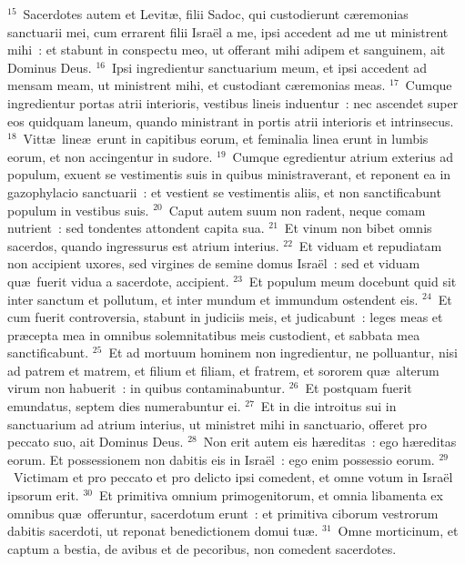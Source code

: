 ${}^{15}$~Sacerdotes autem et Levit\ae , filii Sadoc, qui custodierunt c\ae remonias sanctuarii mei, cum errarent filii Isra\"el a me, ipsi accedent ad me ut ministrent mihi~: et stabunt in conspectu meo, ut offerant mihi adipem et sanguinem, ait Dominus Deus.
${}^{16}$~Ipsi ingredientur sanctuarium meum, et ipsi accedent ad mensam meam, ut ministrent mihi, et custodiant c\ae remonias meas.
${}^{17}$~Cumque ingredientur portas atrii interioris, vestibus lineis induentur~: nec ascendet super eos quidquam laneum, quando ministrant in portis atrii interioris et intrinsecus.
${}^{18}$~Vitt\ae\ line\ae\ erunt in capitibus eorum, et feminalia linea erunt in lumbis eorum, et non accingentur in sudore.
${}^{19}$~Cumque egredientur atrium exterius ad populum, exuent se vestimentis suis in quibus ministraverant, et reponent ea in gazophylacio sanctuarii~: et vestient se vestimentis aliis, et non sanctificabunt populum in vestibus suis.
${}^{20}$~Caput autem suum non radent, neque comam nutrient~: sed tondentes attondent capita sua.
${}^{21}$~Et vinum non bibet omnis sacerdos, quando ingressurus est atrium interius.
${}^{22}$~Et viduam et repudiatam non accipient uxores, sed virgines de semine domus Isra\"el~: sed et viduam qu\ae\ fuerit vidua a sacerdote, accipient.
${}^{23}$~Et populum meum docebunt quid sit inter sanctum et pollutum, et inter mundum et immundum ostendent eis.
${}^{24}$~Et cum fuerit controversia, stabunt in judiciis meis, et judicabunt~: leges meas et pr\ae cepta mea in omnibus solemnitatibus meis custodient, et sabbata mea sanctificabunt.
${}^{25}$~Et ad mortuum hominem non ingredientur, ne polluantur, nisi ad patrem et matrem, et filium et filiam, et fratrem, et sororem qu\ae\ alterum virum non habuerit~: in quibus contaminabuntur.
${}^{26}$~Et postquam fuerit emundatus, septem dies numerabuntur ei.
${}^{27}$~Et in die introitus sui in sanctuarium ad atrium interius, ut ministret mihi in sanctuario, offeret pro peccato suo, ait Dominus Deus.
${}^{28}$~Non erit autem eis h\ae reditas~: ego h\ae reditas eorum. Et possessionem non dabitis eis in Isra\"el~: ego enim possessio eorum.
${}^{29}$~Victimam et pro peccato et pro delicto ipsi comedent, et omne votum in Isra\"el ipsorum erit.
${}^{30}$~Et primitiva omnium primogenitorum, et omnia libamenta ex omnibus qu\ae\ offeruntur, sacerdotum erunt~: et primitiva ciborum vestrorum dabitis sacerdoti, ut reponat benedictionem domui tu\ae .
${}^{31}$~Omne morticinum, et captum a bestia, de avibus et de pecoribus, non comedent sacerdotes.

